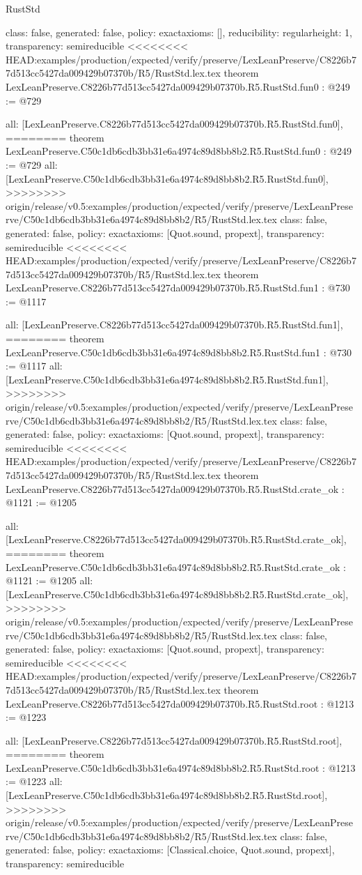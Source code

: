 \begin{lexlean}{RustStd}
\begin{coremodule}
{\begin{coremodule}
{{{  class: false,
  generated: false,
  policy: exact{axioms: []},
  reducibility: regular{height: 1},
  transparency: semireducible
}
<<<<<<<< HEAD:examples/production/expected/verify/preserve/LexLeanPreserve/C8226b77d513cc5427da009429b07370b/R5/RustStd.lex.tex
theorem LexLeanPreserve.C8226b77d513cc5427da009429b07370b.R5.RustStd.fun0 : @249 := @729 {
  all: [LexLeanPreserve.C8226b77d513cc5427da009429b07370b.R5.RustStd.fun0],
========
theorem LexLeanPreserve.C50c1db6cdb3bb31e6a4974c89d8bb8b2.R5.RustStd.fun0 : @249 := @729 {
  all: [LexLeanPreserve.C50c1db6cdb3bb31e6a4974c89d8bb8b2.R5.RustStd.fun0],
>>>>>>>> origin/release/v0.5:examples/production/expected/verify/preserve/LexLeanPreserve/C50c1db6cdb3bb31e6a4974c89d8bb8b2/R5/RustStd.lex.tex
  class: false,
  generated: false,
  policy: exact{axioms: [Quot.sound, propext]},
  transparency: semireducible
}
<<<<<<<< HEAD:examples/production/expected/verify/preserve/LexLeanPreserve/C8226b77d513cc5427da009429b07370b/R5/RustStd.lex.tex
theorem LexLeanPreserve.C8226b77d513cc5427da009429b07370b.R5.RustStd.fun1 : @730 := @1117 {
  all: [LexLeanPreserve.C8226b77d513cc5427da009429b07370b.R5.RustStd.fun1],
========
theorem LexLeanPreserve.C50c1db6cdb3bb31e6a4974c89d8bb8b2.R5.RustStd.fun1 : @730 := @1117 {
  all: [LexLeanPreserve.C50c1db6cdb3bb31e6a4974c89d8bb8b2.R5.RustStd.fun1],
>>>>>>>> origin/release/v0.5:examples/production/expected/verify/preserve/LexLeanPreserve/C50c1db6cdb3bb31e6a4974c89d8bb8b2/R5/RustStd.lex.tex
  class: false,
  generated: false,
  policy: exact{axioms: [Quot.sound, propext]},
  transparency: semireducible
}
<<<<<<<< HEAD:examples/production/expected/verify/preserve/LexLeanPreserve/C8226b77d513cc5427da009429b07370b/R5/RustStd.lex.tex
theorem LexLeanPreserve.C8226b77d513cc5427da009429b07370b.R5.RustStd.crate_ok : @1121 := @1205 {
  all: [LexLeanPreserve.C8226b77d513cc5427da009429b07370b.R5.RustStd.crate_ok],
========
theorem LexLeanPreserve.C50c1db6cdb3bb31e6a4974c89d8bb8b2.R5.RustStd.crate_ok : @1121 := @1205 {
  all: [LexLeanPreserve.C50c1db6cdb3bb31e6a4974c89d8bb8b2.R5.RustStd.crate_ok],
>>>>>>>> origin/release/v0.5:examples/production/expected/verify/preserve/LexLeanPreserve/C50c1db6cdb3bb31e6a4974c89d8bb8b2/R5/RustStd.lex.tex
  class: false,
  generated: false,
  policy: exact{axioms: [Quot.sound, propext]},
  transparency: semireducible
}
<<<<<<<< HEAD:examples/production/expected/verify/preserve/LexLeanPreserve/C8226b77d513cc5427da009429b07370b/R5/RustStd.lex.tex
theorem LexLeanPreserve.C8226b77d513cc5427da009429b07370b.R5.RustStd.root : @1213 := @1223 {
  all: [LexLeanPreserve.C8226b77d513cc5427da009429b07370b.R5.RustStd.root],
========
theorem LexLeanPreserve.C50c1db6cdb3bb31e6a4974c89d8bb8b2.R5.RustStd.root : @1213 := @1223 {
  all: [LexLeanPreserve.C50c1db6cdb3bb31e6a4974c89d8bb8b2.R5.RustStd.root],
>>>>>>>> origin/release/v0.5:examples/production/expected/verify/preserve/LexLeanPreserve/C50c1db6cdb3bb31e6a4974c89d8bb8b2/R5/RustStd.lex.tex
  class: false,
  generated: false,
  policy: exact{axioms: [Classical.choice, Quot.sound, propext]},
  transparency: semireducible
}

}}}}}}
\end{coremodule}}
\end{coremodule}
\end{lexlean}
